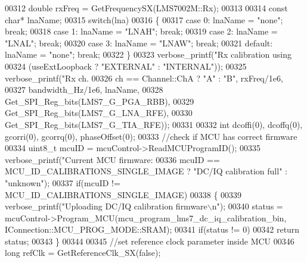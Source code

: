 \begin{DoxyCode}
{{{{{{{{{{{00312     \textcolor{keywordtype}{double} rxFreq = GetFrequencySX(LMS7002M::Rx);
00313 
00314     \textcolor{keyword}{const} \textcolor{keywordtype}{char}* lnaName;
00315     \textcolor{keywordflow}{switch}(lna)
00316     \{
00317         \textcolor{keywordflow}{case} 0: lnaName = \textcolor{stringliteral}{"none"}; \textcolor{keywordflow}{break};
00318         \textcolor{keywordflow}{case} 1: lnaName = \textcolor{stringliteral}{"LNAH"}; \textcolor{keywordflow}{break};
00319         \textcolor{keywordflow}{case} 2: lnaName = \textcolor{stringliteral}{"LNAL"}; \textcolor{keywordflow}{break};
00320         \textcolor{keywordflow}{case} 3: lnaName = \textcolor{stringliteral}{"LNAW"}; \textcolor{keywordflow}{break};
00321         \textcolor{keywordflow}{default}: lnaName = \textcolor{stringliteral}{"none"}; \textcolor{keywordflow}{break};
00322     \}
00323     verbose_printf(\textcolor{stringliteral}{"Rx calibration using %
00324         (useExtLoopback ? \textcolor{stringliteral}{"EXTERNAL"} : \textcolor{stringliteral}{"INTERNAL"}));
00325     verbose_printf(\textcolor{stringliteral}{"Rx ch.%
00326                 ch == Channel::ChA ? \textcolor{stringliteral}{"A"} : \textcolor{stringliteral}{"B"}, rxFreq/1e6,
00327                 bandwidth\_Hz/1e6, lnaName,
00328                 Get_SPI_Reg_bits(LMS7_G_PGA_RBB),
00329                 Get_SPI_Reg_bits(LMS7_G_LNA_RFE),
00330                 Get_SPI_Reg_bits(LMS7_G_TIA_RFE));
00331 
00332     \textcolor{keywordtype}{int} dcoffi(0), dcoffq(0), gcorri(0), gcorrq(0), phaseOffset(0);
00333     \textcolor{comment}{//check if MCU has correct firmware}
00334     uint8\_t mcuID = mcuControl->ReadMCUProgramID();
00335     verbose_printf(\textcolor{stringliteral}{"Current MCU firmware: %
00336         mcuID == MCU_ID_CALIBRATIONS_SINGLE_IMAGE ? \textcolor{stringliteral}{"DC/IQ calibration full"} : \textcolor{stringliteral}{"unknown"});
00337     \textcolor{keywordflow}{if}(mcuID != MCU_ID_CALIBRATIONS_SINGLE_IMAGE)
00338     \{
00339         verbose_printf(\textcolor{stringliteral}{"Uploading DC/IQ calibration firmware\(\backslash\)n"});
00340         status = mcuControl->Program\_MCU(mcu_program_lms7_dc_iq_calibration_bin, 
      IConnection::MCU\_PROG\_MODE::SRAM);
00341         \textcolor{keywordflow}{if}(status != 0)
00342             \textcolor{keywordflow}{return} status;
00343     \}
00344 
00345     \textcolor{comment}{//set reference clock parameter inside MCU}
00346     \textcolor{keywordtype}{long} refClk = GetReferenceClk\_SX(\textcolor{keyword}{false});
}}}}}}}}}}}}}}
\end{DoxyCode}
